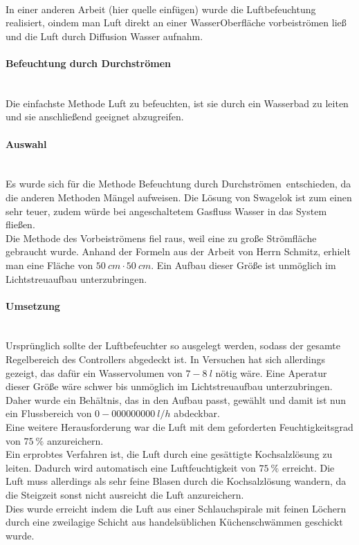 \hfill \\

In einer anderen Arbeit (hier quelle einfügen) wurde die Luftbefeuchtung realisiert, oindem man Luft direkt an einer  WasserOberfläche vorbeiströmen ließ und die Luft durch Diffusion Wasser aufnahm. 

\paragraph{Befeuchtung durch Durchströmen}
\hfill \\

Die einfachste Methode Luft zu befeuchten, ist sie durch ein Wasserbad zu leiten und sie anschließend geeignet abzugreifen.


\paragraph{Auswahl}

\hfill \\

Es wurde sich für die Methode \glqq Befeuchtung durch Durchströmen\grqq \ entschieden, da die anderen Methoden Mängel aufweisen. Die Lösung von Swagelok ist zum einen sehr teuer, zudem würde bei angeschaltetem Gasfluss Wasser in das System fließen. \\
Die Methode des Vorbeiströmens fiel raus, weil eine zu große Strömfläche gebraucht wurde. Anhand der Formeln aus der Arbeit von Herrn Schmitz, erhielt man eine Fläche von $\SI{50}{cm} \cdot \SI{50}{cm}$. Ein Aufbau dieser Größe ist unmöglich im Lichtstreuaufbau unterzubringen.

\paragraph{Umsetzung}

\hfill \\

Ursprünglich sollte der Luftbefeuchter so ausgelegt werden, sodass der gesamte Regelbereich des Controllers abgedeckt ist. In Versuchen hat sich allerdings gezeigt, das dafür ein Wasservolumen von $7 - \SI{8}{l} $ nötig wäre. Eine Aperatur dieser Größe wäre schwer bis unmöglich im Lichtstreuaufbau unterzubringen. Daher wurde ein Behältnis, das in den Aufbau passt, gewählt und damit ist nun ein Flussbereich von $0 - \SI{000000000}{l/h}$ abdeckbar. \\
Eine weitere Herausforderung war die Luft mit dem geforderten Feuchtigkeitsgrad von $\SI{75}{\%}$ anzureichern. \\
Ein erprobtes Verfahren ist, die Luft durch eine gesättigte Kochsalzlösung zu leiten. Dadurch wird automatisch eine Luftfeuchtigkeit von $\SI{75}{\%}$ erreicht. Die Luft muss allerdings als sehr feine Blasen durch die Kochsalzlösung wandern, da die Steigzeit sonst nicht ausreicht die Luft anzureichern. \\
Dies wurde erreicht indem die Luft aus einer Schlauchspirale mit feinen Löchern durch eine zweilagige Schicht aus handelsüblichen Küchenschwämmen geschickt wurde. 


